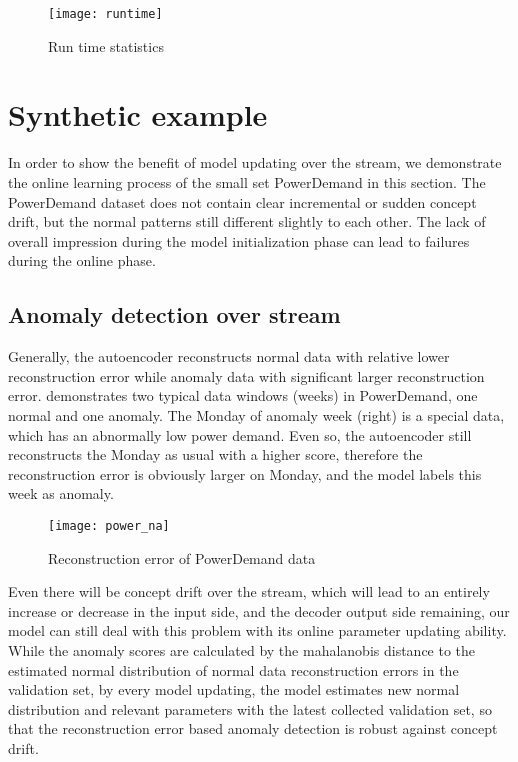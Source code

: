 \begin{figure}[h]
\centering
\texttt{[image: runtime]}
\caption[Run time statistics]{Run time statistics}
\label{fig:runtime}
\end{figure}


\section{Synthetic example}
\label{sec:synthetic}

In order to show the benefit of model updating over the stream, we demonstrate the online learning process of the small set PowerDemand in this section. The PowerDemand dataset does not contain clear incremental or sudden concept drift, but the normal patterns still different slightly to each other. The lack of overall impression during the model initialization phase can lead to failures during the online phase. 

\subsection{Anomaly detection over stream}
\label{sec:detection}

Generally, the autoencoder reconstructs normal data with relative lower reconstruction error while anomaly data with significant larger reconstruction error.  demonstrates two typical data windows (weeks) in PowerDemand, one normal and one anomaly. The Monday of anomaly week (right) is a special data, which has an abnormally low power demand. Even so, the autoencoder still reconstructs the Monday as usual with a higher score, therefore the reconstruction error is obviously larger on Monday, and the model labels this week as anomaly.\\

\begin{figure}[h]
\centering
\texttt{[image: power\_na]}
\caption[Reconstruction error of PowerDemand data]{Reconstruction error of PowerDemand data}
\label{fig:power_re}
\end{figure}

Even there will be concept drift over the stream, which will lead to an entirely increase or decrease in the input side, and the decoder output side remaining, our model can still deal with this problem with its online parameter updating ability. While the anomaly scores are calculated by the mahalanobis distance to the estimated normal distribution of normal data reconstruction errors in the validation set, by every model updating, the model estimates new normal distribution and relevant parameters with the latest collected validation set, so that the reconstruction error based anomaly detection is robust against concept drift.\\



